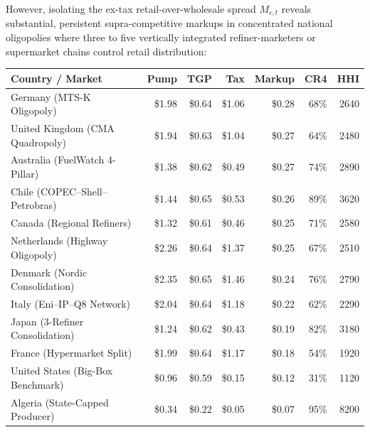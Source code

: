 \documentclass[11pt]{article}
\begin{document}
However, isolating the ex-tax retail-over-wholesale spread $M_{c,t}$ reveals substantial, persistent supra-competitive markups in concentrated national oligopolies where three to five vertically integrated refiner-marketers or supermarket chains control retail distribution:
\begin{center}
\begin{tabular}{p{5.2cm}rrrrrr}
\hline
\textbf{Country / Market} & \textbf{Pump} & \textbf{TGP} & \textbf{Tax} & \textbf{Markup} & \textbf{CR4} & \textbf{HHI} \\
\hline
Germany (MTS-K Oligopoly) & \$1.98 & \$0.64 & \$1.06 & \$0.28 & 68\% & 2640 \\
United Kingdom (CMA Quadropoly) & \$1.94 & \$0.63 & \$1.04 & \$0.27 & 64\% & 2480 \\
Australia (FuelWatch 4-Pillar) & \$1.38 & \$0.62 & \$0.49 & \$0.27 & 74\% & 2890 \\
Chile (COPEC--Shell--Petrobras) & \$1.44 & \$0.65 & \$0.53 & \$0.26 & 89\% & 3620 \\
Canada (Regional Refiners) & \$1.32 & \$0.61 & \$0.46 & \$0.25 & 71\% & 2580 \\
Netherlands (Highway Oligopoly) & \$2.26 & \$0.64 & \$1.37 & \$0.25 & 67\% & 2510 \\
Denmark (Nordic Consolidation) & \$2.35 & \$0.65 & \$1.46 & \$0.24 & 76\% & 2790 \\
Italy (Eni--IP--Q8 Network) & \$2.04 & \$0.64 & \$1.18 & \$0.22 & 62\% & 2290 \\
Japan (3-Refiner Consolidation) & \$1.24 & \$0.62 & \$0.43 & \$0.19 & 82\% & 3180 \\
France (Hypermarket Split) & \$1.99 & \$0.64 & \$1.17 & \$0.18 & 54\% & 1920 \\
United States (Big-Box Benchmark) & \$0.96 & \$0.59 & \$0.15 & \$0.12 & 31\% & 1120 \\
Algeria (State-Capped Producer) & \$0.34 & \$0.22 & \$0.05 & \$0.07 & 95\% & 8200 \\
\hline
\end{tabular}
\end{center}
\end{document}
